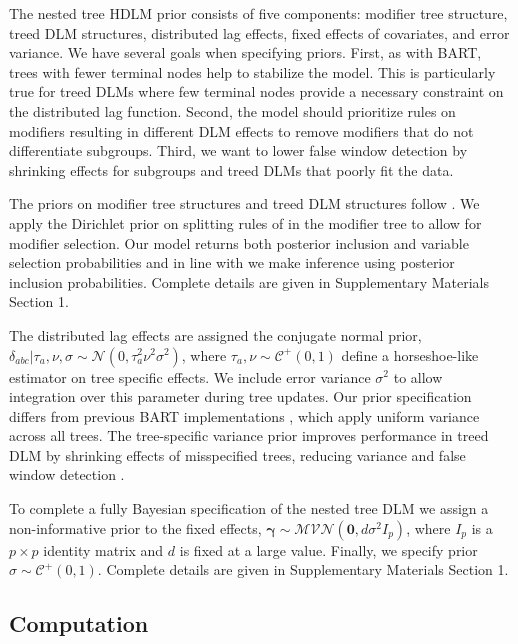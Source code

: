 \documentclass[12pt]{article}
\begin{document}
The nested tree HDLM prior consists of five components: modifier tree structure, treed DLM structures, distributed lag effects, fixed effects of covariates, and error variance. We have several goals when specifying priors. First, as with BART, trees with fewer terminal nodes help to stabilize the model. This is particularly true for treed DLMs where few terminal nodes provide a necessary constraint on the distributed lag function. Second, the model should prioritize rules on modifiers resulting in different DLM effects to remove modifiers that do not differentiate subgroups. Third, we want to lower false window detection by shrinking effects for subgroups and treed DLMs that poorly fit the data.

The priors on modifier tree structures and treed DLM structures follow \citet{Chipman2012}. We apply the Dirichlet prior on splitting rules of \citet{Linero2018b} in the modifier tree to allow for modifier selection. Our model returns both posterior inclusion and variable selection probabilities and in line with \citet{Linero2018b} we make inference using posterior inclusion probabilities. Complete details are given in Supplementary Materials Section 1.

The distributed lag effects are assigned the conjugate normal prior, $\delta_{abc} |\tau_a, \nu, \sigma \sim\mathcal{N}(0,\tau_a^2\nu^2\sigma^2)$,
where $\tau_a,\nu\sim\mathcal{C}^+(0,1)$ define a horseshoe-like estimator on tree specific effects. We include error variance $\sigma^2$ to allow integration over this parameter during tree updates. Our prior specification differs from previous BART implementations \citep{Chipman2012,Starling2019}, which apply uniform variance across all trees. The tree-specific variance prior improves performance in treed DLM by shrinking effects of misspecified trees, reducing variance and false window detection \citep{Mork2023EstimatingPairs}. 

To complete a fully Bayesian specification of the nested tree DLM we assign a non-informative prior to the fixed effects, $\boldsymbol\gamma\sim\mathcal{MVN}(\mathbf{0},d\sigma^2 I_p)$, where $I_p$ is a $p\times p$ identity matrix and $d$ is fixed at a large value. Finally, we specify prior $\sigma\sim\mathcal{C}^+(0,1)$. Complete details are given in Supplementary Materials Section 1.




\subsection{Computation}
\end{document}
